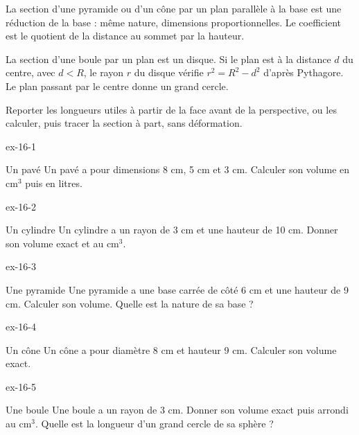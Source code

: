 \begin{propriete}La section d’une pyramide ou d’un cône par un plan parallèle à la base est une réduction de la base : même nature, dimensions proportionnelles. Le coefficient est le quotient de la distance au sommet par la hauteur.\end{propriete}
\begin{propriete}La section d’une boule par un plan est un disque. Si le plan est à la distance $d$ du centre, avec $d<R$, le rayon $r$ du disque vérifie $r^2=R^2-d^2$ d’après Pythagore. Le plan passant par le centre donne un grand cercle.\end{propriete}
\begin{savoirfaire}Reporter les longueurs utiles à partir de la face avant de la perspective, ou les calculer, puis tracer la section à part, sans déformation.\end{savoirfaire}
\clearpage{}
\begin{blocLivre}{ex-16-1}\begin{exercice}[1]{Un pavé}
Un pavé a pour dimensions 8 cm, 5 cm et 3 cm. Calculer son volume en cm$^3$ puis en litres.
\label{fig-ex-16-1}
\end{exercice}\end{blocLivre}
\begin{blocLivre}{ex-16-2}\begin{exercice}[1]{Un cylindre}
Un cylindre a un rayon de 3 cm et une hauteur de 10 cm. Donner son volume exact et au cm$^3$.
\label{fig-ex-16-2}
\end{exercice}\end{blocLivre}
\begin{blocLivre}{ex-16-3}\begin{exercice}[1]{Une pyramide}
Une pyramide a une base carrée de côté 6 cm et une hauteur de 9 cm. Calculer son volume. Quelle est la nature de sa base ?
\label{fig-ex-16-3}
\end{exercice}\end{blocLivre}
\begin{blocLivre}{ex-16-4}\begin{exercice}[1]{Un cône}
Un cône a pour diamètre 8 cm et hauteur 9 cm. Calculer son volume exact.
\label{fig-ex-16-4}
\end{exercice}\end{blocLivre}
\begin{blocLivre}{ex-16-5}\begin{exercice}[1]{Une boule}
Une boule a un rayon de 3 cm. Donner son volume exact puis arrondi au cm$^3$. Quelle est la longueur d’un grand cercle de sa sphère ?
\label{fig-ex-16-5}
\end{exercice}\end{blocLivre}

